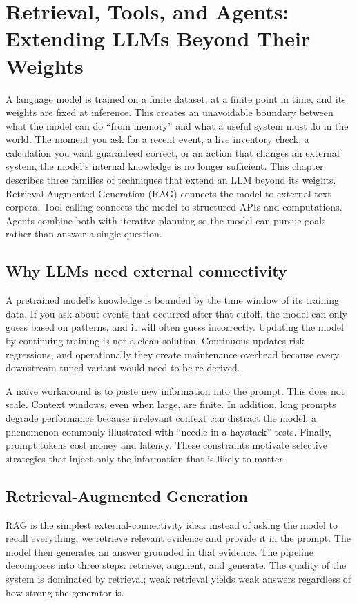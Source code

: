 
\chapter{Retrieval, Tools, and Agents: Extending LLMs Beyond Their Weights}
\label{chap:rag-tools-agents}

A language model is trained on a finite dataset, at a finite point in time, and its weights are fixed at inference. This creates an unavoidable boundary between what the model can do “from memory” and what a useful system must do in the world. The moment you ask for a recent event, a live inventory check, a calculation you want guaranteed correct, or an action that changes an external system, the model’s internal knowledge is no longer sufficient. This chapter describes three families of techniques that extend an LLM beyond its weights. Retrieval-Augmented Generation (RAG) connects the model to external text corpora. Tool calling connects the model to structured APIs and computations. Agents combine both with iterative planning so the model can pursue goals rather than answer a single question.

\section{Why LLMs need external connectivity}
A pretrained model’s knowledge is bounded by the time window of its training data. If you ask about events that occurred after that cutoff, the model can only guess based on patterns, and it will often guess incorrectly. Updating the model by continuing training is not a clean solution. Continuous updates risk regressions, and operationally they create maintenance overhead because every downstream tuned variant would need to be re-derived.

A naïve workaround is to paste new information into the prompt. This does not scale. Context windows, even when large, are finite. In addition, long prompts degrade performance because irrelevant context can distract the model, a phenomenon commonly illustrated with “needle in a haystack” tests. Finally, prompt tokens cost money and latency. These constraints motivate selective strategies that inject only the information that is likely to matter.

\section{Retrieval-Augmented Generation}
RAG is the simplest external-connectivity idea: instead of asking the model to recall everything, we retrieve relevant evidence and provide it in the prompt. The model then generates an answer grounded in that evidence. The pipeline decomposes into three steps: retrieve, augment, and generate. The quality of the system is dominated by retrieval; weak retrieval yields weak answers regardless of how strong the generator is.


